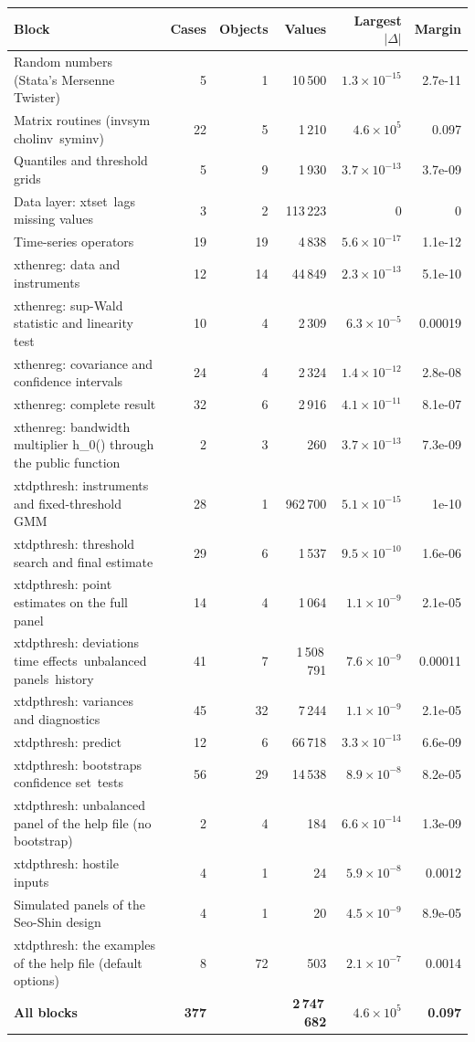 \documentclass[10.5pt,a4paper]{article}
\begin{document}
\begin{longtable}{@{}p{7.4cm}rrrrr@{}}
\toprule
Block & Cases & Objects & Values & Largest $|\Delta|$ & Margin \\
\midrule
\endhead
Random numbers (Stata's Mersenne Twister) & 5 & 1 & 10\,500 & $1.3\times10^{-15}$ & 2.7e-11 \\
Matrix routines (invsym\, cholinv\, syminv) & 22 & 5 & 1\,210 & $4.6\times10^{5}$ & 0.097 \\
Quantiles and threshold grids & 5 & 9 & 1\,930 & $3.7\times10^{-13}$ & 3.7e-09 \\
Data layer: xtset\, lags\, missing values & 3 & 2 & 113\,223 & 0 & 0 \\
Time-series operators & 19 & 19 & 4\,838 & $5.6\times10^{-17}$ & 1.1e-12 \\
xthenreg: data and instruments & 12 & 14 & 44\,849 & $2.3\times10^{-13}$ & 5.1e-10 \\
xthenreg: sup-Wald statistic and linearity test & 10 & 4 & 2\,309 & $6.3\times10^{-5}$ & 0.00019 \\
xthenreg: covariance and confidence intervals & 24 & 4 & 2\,324 & $1.4\times10^{-12}$ & 2.8e-08 \\
xthenreg: complete result & 32 & 6 & 2\,916 & $4.1\times10^{-11}$ & 8.1e-07 \\
xthenreg: bandwidth multiplier h\_0() through the public function & 2 & 3 & 260 & $3.7\times10^{-13}$ & 7.3e-09 \\
xtdpthresh: instruments and fixed-threshold GMM & 28 & 1 & 962\,700 & $5.1\times10^{-15}$ & 1e-10 \\
xtdpthresh: threshold search and final estimate & 29 & 6 & 1\,537 & $9.5\times10^{-10}$ & 1.6e-06 \\
xtdpthresh: point estimates on the full panel & 14 & 4 & 1\,064 & $1.1\times10^{-9}$ & 2.1e-05 \\
xtdpthresh: deviations\, time effects\, unbalanced panels\, history & 41 & 7 & 1\,508\,791 & $7.6\times10^{-9}$ & 0.00011 \\
xtdpthresh: variances and diagnostics & 45 & 32 & 7\,244 & $1.1\times10^{-9}$ & 2.1e-05 \\
xtdpthresh: predict & 12 & 6 & 66\,718 & $3.3\times10^{-13}$ & 6.6e-09 \\
xtdpthresh: bootstraps\, confidence set\, tests & 56 & 29 & 14\,538 & $8.9\times10^{-8}$ & 8.2e-05 \\
xtdpthresh: unbalanced panel of the help file (no bootstrap) & 2 & 4 & 184 & $6.6\times10^{-14}$ & 1.3e-09 \\
xtdpthresh: hostile inputs & 4 & 1 & 24 & $5.9\times10^{-8}$ & 0.0012 \\
Simulated panels of the Seo-Shin design & 4 & 1 & 20 & $4.5\times10^{-9}$ & 8.9e-05 \\
xtdpthresh: the examples of the help file (default options) & 8 & 72 & 503 & $2.1\times10^{-7}$ & 0.0014 \\
\midrule
\textbf{All blocks} & \textbf{377} & & \textbf{2\,747\,682} & \textbf{$4.6\times10^{5}$} & \textbf{0.097} \\
\bottomrule
\end{longtable}
\end{document}
